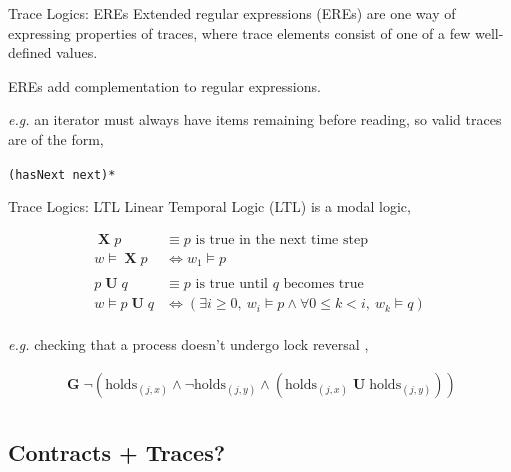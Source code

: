 \documentclass[12pt]{beamer}
\DeclareMathOperator{\lX}{\textbf{X}}
\DeclareMathOperator{\lU}{\textbf{U}}
\DeclareMathOperator{\lG}{\textbf{G}}
\newcommand{\holds}[2]{\mathrm{holds}_{\left(#1,#2\right)}}
\begin{document}
\begin{frame}{Trace Logics: \small EREs \parencite{eres}}
  Extended regular expressions (EREs) are one way of expressing
  properties of traces, where trace elements consist of one of a few
  well-defined values.

  \vspace{0.25cm}

  EREs add complementation to regular expressions.

  \vspace{0.25cm}

  \textit{e.g.} an iterator must always have items remaining before
  reading, so valid traces are of the form,

  \begin{center}
    \texttt{(hasNext next)*}
  \end{center}
\end{frame}

\begin{frame}{Trace Logics: \small LTL \parencite{ltl}}
  Linear Temporal Logic (LTL) is a modal logic,

  \begin{align*}
    \lX p &\equiv \mbox{$p$ is true in the next time step}\\
    w \models \lX p &\Leftrightarrow w_{1} \models p\\\\
    p \lU q &\equiv \mbox{$p$ is true until $q$ becomes true}\\
    w \models p \lU q &\Leftrightarrow \left(\exists i \geq 0,\ w_{i}
      \models p \land \forall 0 \leq k < i,\ w_{k}
      \models q\right)\\
  \end{align*}

  \textit{e.g.} checking that a process doesn't undergo lock
  reversal \parencite{hask},

  \begin{align*}
    \lG \lnot\left(\holds{j}{x} \land \lnot \holds{j}{y} \land
      \left(\holds{j}{x} \lU \holds{j}{y}\right)\right)\\
  \end{align*}
\end{frame}


\subsection{Contracts + Traces?}
\label{sec:runver-tbc}
\end{document}
